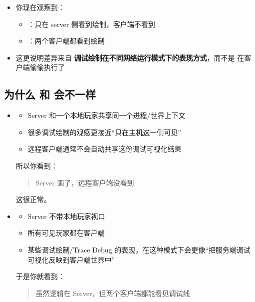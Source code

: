 \begin{itemize}
	\item 你现在观察到：
	\begin{itemize}
		\item {}：只在 server 侧看到绘制，客户端不看到
		\item {}：两个客户端都看到绘制
	\end{itemize}
	\item 这更说明差异来自 \textbf{调试绘制在不同网络运行模式下的表现方式}，而不是  在客户端偷偷执行了
\end{itemize}

\subsection{为什么  和  会不一样}
\begin{itemize}
	
	\item \textbf{}
	
	\begin{itemize}
		\item Server 和一个本地玩家共享同一个进程/世界上下文
		\item 很多调试绘制的观感更接近“只在主机这一侧可见”
		\item 远程客户端通常不会自动共享这份调试可视化结果
	\end{itemize}
	
	所以你看到：
	
	\begin{quote}
		Server 画了，远程客户端没看到
	\end{quote}
	
	这很正常。
	
	\item \textbf{}
	
	\begin{itemize}
		\item Server 不带本地玩家视口
		\item 所有可见玩家都在客户端
		\item 某些调试绘制/Trace Debug 的表现，在这种模式下会更像“把服务端调试可视化反映到客户端世界中”
	\end{itemize}
	
	于是你就看到：
	
	\begin{quote}
		虽然逻辑在 Server，但两个客户端都能看见调试线
	\end{quote}
\end{itemize}
